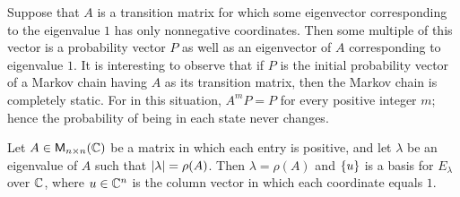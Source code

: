 \begin{note}
	Suppose that \(A\) is a transition matrix for which some eigenvector corresponding to the eigenvalue \(1\) has only nonnegative coordinates.
	Then some multiple of this vector is a probability vector \(P\) as well as an eigenvector of \(A\) corresponding to eigenvalue \(1\).
	It is interesting to observe that if \(P\) is the initial probability vector of a Markov chain having \(A\) as its transition matrix, then the Markov chain is completely static.
	For in this situation, \(A^m P = P\) for every positive integer \(m\);
	hence the probability of being in each state never changes.
\end{note}

\begin{thm}\label{5.18}
	Let \(A \in \mathsf{M}_{{n} \times n}({\mathbb{C}})\) be a matrix in which each entry is positive, and let \(\lambda\) be an eigenvalue of \(A\) such that \(\left\lvert\lambda\right\rvert = \rho(A)\).
	Then \(\lambda = \rho(A)\) and \(\left\lbrace u\right\rbrace\) is a basis for \(E_{\lambda}\) over \(\mathbb{C}\), where \(u \in \mathbb{C}^n\) is the column vector in which each coordinate equals \(1\).
\end{thm}


